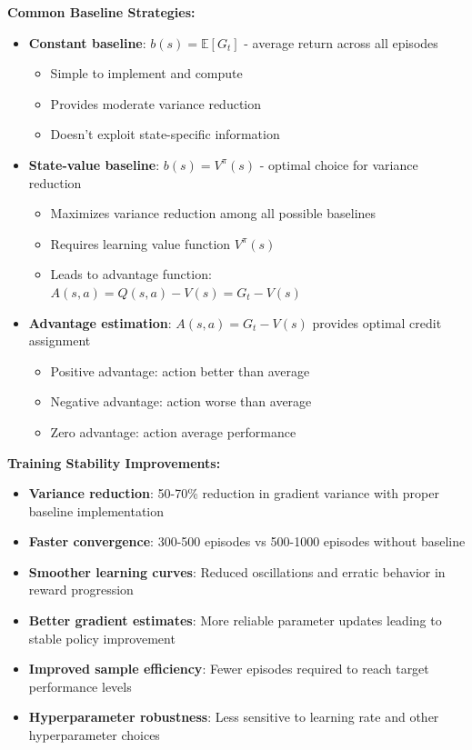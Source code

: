 \documentclass[12pt]{article}
\begin{document}
{{{\textbf{Common Baseline Strategies:}
\begin{itemize}
    \item \textbf{Constant baseline}: $b(s) = \mathbb{E}[G_t]$ - average return across all episodes
    \begin{itemize}
        \item Simple to implement and compute
        \item Provides moderate variance reduction
        \item Doesn't exploit state-specific information
    \end{itemize}
    \item \textbf{State-value baseline}: $b(s) = V^\pi(s)$ - optimal choice for variance reduction
    \begin{itemize}
        \item Maximizes variance reduction among all possible baselines
        \item Requires learning value function $V^\pi(s)$
        \item Leads to advantage function: $A(s,a) = Q(s,a) - V(s) = G_t - V(s)$
    \end{itemize}
    \item \textbf{Advantage estimation}: $A(s,a) = G_t - V(s)$ provides optimal credit assignment
    \begin{itemize}
        \item Positive advantage: action better than average
        \item Negative advantage: action worse than average
        \item Zero advantage: action average performance
    \end{itemize}
\end{itemize}

\textbf{Training Stability Improvements:}
\begin{itemize}
    \item \textbf{Variance reduction}: 50-70\% reduction in gradient variance with proper baseline implementation
    \item \textbf{Faster convergence}: 300-500 episodes vs 500-1000 episodes without baseline
    \item \textbf{Smoother learning curves}: Reduced oscillations and erratic behavior in reward progression
    \item \textbf{Better gradient estimates}: More reliable parameter updates leading to stable policy improvement
    \item \textbf{Improved sample efficiency}: Fewer episodes required to reach target performance levels
    \item \textbf{Hyperparameter robustness}: Less sensitive to learning rate and other hyperparameter choices
\end{itemize}

}}}
\end{document}
